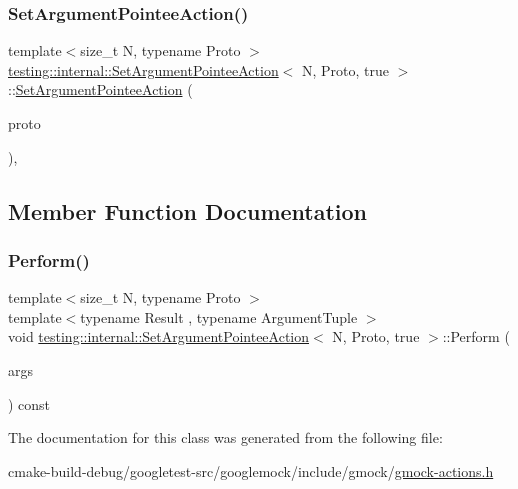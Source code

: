 \subsubsection{\texorpdfstring{SetArgumentPointeeAction()}{SetArgumentPointeeAction()}}
{\footnotesize\ttfamily template$<$size\+\_\+t N, typename Proto $>$ \\
\mbox{\hyperlink{classtesting_1_1internal_1_1SetArgumentPointeeAction}{testing\+::internal\+::\+Set\+Argument\+Pointee\+Action}}$<$ N, Proto, true $>$\+::\mbox{\hyperlink{classtesting_1_1internal_1_1SetArgumentPointeeAction}{Set\+Argument\+Pointee\+Action}} (\begin{DoxyParamCaption}\item[{const Proto \&}]{proto }\end{DoxyParamCaption})\hspace{0.3cm}{\ttfamily [inline]}, {\ttfamily [explicit]}}



\subsection{Member Function Documentation}
\mbox{\label{classtesting_1_1internal_1_1SetArgumentPointeeAction_3_01N_00_01Proto_00_01true_01_4_ac89fa5dde5d2683206a77d29630917cd}} 
\subsubsection{\texorpdfstring{Perform()}{Perform()}}
{\footnotesize\ttfamily template$<$size\+\_\+t N, typename Proto $>$ \\
template$<$typename Result , typename Argument\+Tuple $>$ \\
void \mbox{\hyperlink{classtesting_1_1internal_1_1SetArgumentPointeeAction}{testing\+::internal\+::\+Set\+Argument\+Pointee\+Action}}$<$ N, Proto, true $>$\+::Perform (\begin{DoxyParamCaption}\item[{const Argument\+Tuple \&}]{args }\end{DoxyParamCaption}) const\hspace{0.3cm}{\ttfamily [inline]}}



The documentation for this class was generated from the following file\+:\begin{DoxyCompactItemize}
\item 
cmake-\/build-\/debug/googletest-\/src/googlemock/include/gmock/\mbox{\hyperlink{gmock-actions_8h}{gmock-\/actions.\+h}}\end{DoxyCompactItemize}
